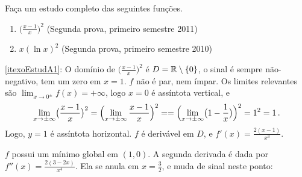 \begin{exo}\label{Exo:DoisEstudosLegais} Faça um estudo completo das seguintes
funções. 
\begin{enumerate}
\item\label{itexoEstudA1} $\bigl(\frac{x-1}{x}\bigr)^2$ (Segunda prova,
primeiro semestre 2011)
\item \label{itexoEstudA3} $x(\ln x)^2$ (Segunda prova, primeiro semestre 2010)
\end{enumerate}
\vspace{0.01cm}
\begin{sol}
\eqref{itexoEstudA1}:
O domínio de $\bigl(\frac{x-1}{x}\bigr)^2$ é $D=\mathbb{R}\setminus \{0\}$, o sinal é
sempre não-negativo, tem um zero
em $x=1$. $f$ não é par, nem ímpar.
Os limites relevantes são $\lim_{x\to 0^{\pm}}f(x)=+\infty$, logo $x=0$ é
assíntota vertical, e
$$\lim_{x\to \pm\infty}\bigl(\frac{x-1}{x}\bigr)^2=\Bigl(\lim_{x\to \pm
\infty}\frac{x-1}{x}\Bigr)^2==\Bigl(\lim_{x\to \pm
\infty}\bigl(1-\frac{1}{x}\bigr)\Bigr)^2=1^2=1\,.$$
Logo, $y=1$ é assíntota horizontal. 
$f$ é derivável em $D$, e $f'(x)=\frac{2(x-1)}{x^3}$.
\begin{center}
\begin{bmlimage}\end{bmlimage}
\end{center}
$f$ possui um mínimo global em $(1,0)$.
A segunda derivada é dada por $f''(x)=\frac{2(3-2x)}{x^4}$. Ela se anula em
$x=\tfrac32$, e muda de sinal neste ponto:
\begin{center}
\begin{bmlimage}\end{bmlimage}

\end{center}
\end{sol}
\end{exo}
